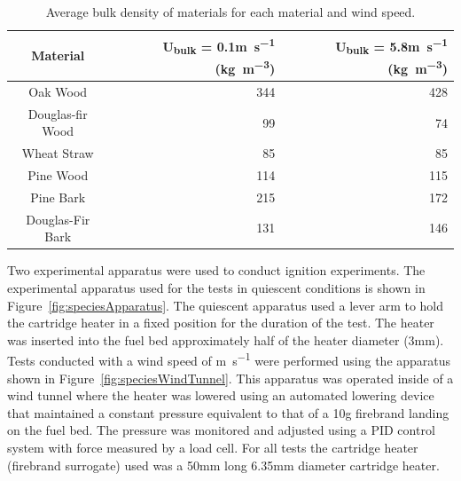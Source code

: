         \begin{table}[hpbt]
        \caption{Average bulk density of materials for each material and wind speed.}
        \centering
        \begin{tabular}{crr}
            Material & U\textsubscript{bulk} = 0.1\si{\meter\per\second} (\si{\kilogram\per\cubic\meter})& U\textsubscript{bulk} = 5.8\si{\meter\per\second} (\si{\kilogram\per\cubic\meter})\\
            \hline
            Oak Wood         & 344 & 428 \\
            Douglas-fir Wood & 99  & 74 \\
            Wheat Straw      & 85  & 85 \\
            Pine Wood        & 114 & 115 \\
            Pine Bark        & 215 & 172 \\
            Douglas-Fir Bark & 131 & 146  
        \end{tabular}
        \label{tab:density}
    \end{table}
    Two experimental apparatus were used to conduct ignition experiments. The experimental apparatus used for the tests in quiescent conditions is shown in Figure~\ref{fig:speciesApparatus}. The quiescent apparatus used a lever arm to hold the cartridge heater in a fixed position for the duration of the test. The heater was inserted into the fuel bed approximately half of the heater diameter (3\si{\milli\meter}). Tests conducted with a wind speed of \si{\meter\per\second} were performed using the apparatus shown in Figure~\ref{fig:speciesWindTunnel}. This apparatus was operated inside of a wind tunnel where the heater was lowered using an automated lowering device that maintained a constant pressure equivalent to that of a 10\si{\gram} firebrand landing on the fuel bed. The pressure was monitored and adjusted using a PID control system with force measured by a load cell. For all tests the cartridge heater (firebrand surrogate) used was a 50\si{\milli\meter} long 6.35\si{\milli\meter} diameter cartridge heater.
